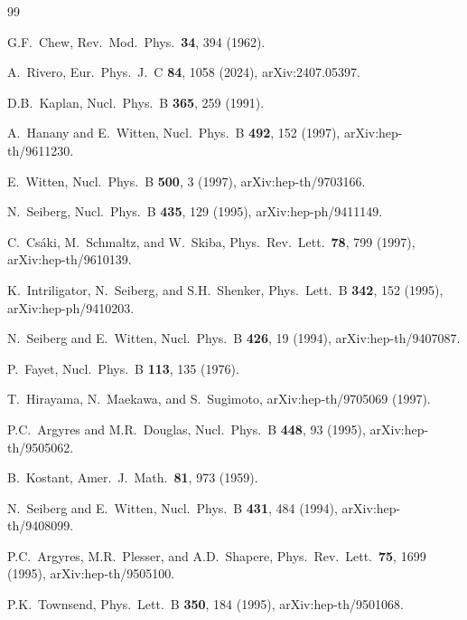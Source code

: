 \documentclass[aps,prd,twocolumn,showpacs,preprintnumbers,superscriptaddress,floatfix]{revtex4-2}
\begin{document}
\begin{thebibliography}{99}

  G.F.~Chew,
  Rev.\ Mod.\ Phys.\ \textbf{34}, 394 (1962).

  A.~Rivero,
  Eur.\ Phys.\ J.\ C \textbf{84}, 1058 (2024),
  arXiv:2407.05397.

  D.B.~Kaplan,
  Nucl.\ Phys.\ B \textbf{365}, 259 (1991).

  A.~Hanany and E.~Witten,
  Nucl.\ Phys.\ B \textbf{492}, 152 (1997),
  arXiv:hep-th/9611230.

  E.~Witten,
  Nucl.\ Phys.\ B \textbf{500}, 3 (1997),
  arXiv:hep-th/9703166.

  N.~Seiberg,
  Nucl.\ Phys.\ B \textbf{435}, 129 (1995),
  arXiv:hep-ph/9411149.

  C.~Cs\'aki, M.~Schmaltz, and W.~Skiba,
  Phys.\ Rev.\ Lett.\ \textbf{78}, 799 (1997),
  arXiv:hep-th/9610139.

  K.~Intriligator, N.~Seiberg, and S.H.~Shenker,
  Phys.\ Lett.\ B \textbf{342}, 152 (1995),
  arXiv:hep-ph/9410203.

  N.~Seiberg and E.~Witten,
  Nucl.\ Phys.\ B \textbf{426}, 19 (1994),
  arXiv:hep-th/9407087.

  P.~Fayet,
  Nucl.\ Phys.\ B \textbf{113}, 135 (1976).

  T.~Hirayama, N.~Maekawa, and S.~Sugimoto,
  arXiv:hep-th/9705069 (1997).

  P.C.~Argyres and M.R.~Douglas,
  Nucl.\ Phys.\ B \textbf{448}, 93 (1995),
  arXiv:hep-th/9505062.

  B.~Kostant,
  Amer.\ J.\ Math.\ \textbf{81}, 973 (1959).

  N.~Seiberg and E.~Witten,
  Nucl.\ Phys.\ B \textbf{431}, 484 (1994),
  arXiv:hep-th/9408099.

  P.C.~Argyres, M.R.~Plesser, and A.D.~Shapere,
  Phys.\ Rev.\ Lett.\ \textbf{75}, 1699 (1995),
  arXiv:hep-th/9505100.

  P.K.~Townsend,
  Phys.\ Lett.\ B \textbf{350}, 184 (1995),
  arXiv:hep-th/9501068.


\end{thebibliography}
\end{document}
